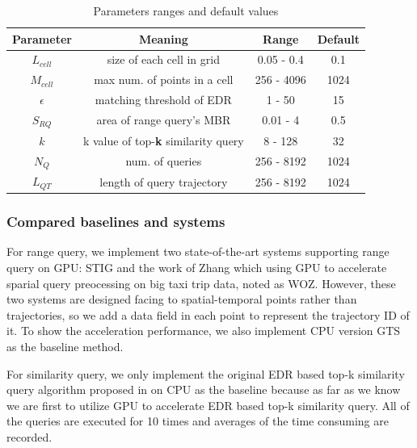 \documentclass[conference]{IEEEtran}
\begin{document}
\begin{table}[!t]
	\renewcommand{\arraystretch}{1.3}
	\caption{Parameters ranges and default values}
	\label{table_param}
	\centering
	\begin{tabular}{|c||c|c|c|}
		\hline
		Parameter & Meaning & Range & Default\\
		\hline
		$L_{cell}$ & size of each cell in grid & 0.05 - 0.4 & 0.1\\
		\hline
		$M_{cell}$ & max num. of points in a cell & 256 - 4096 & 1024\\
		\hline
		$\epsilon$ & matching threshold of EDR & 1 - 50 & 15\\
		\hline
		$S_{RQ}$ & area of range query's MBR & 0.01 - 4 & 0.5\\
		\hline
		$k$ & k value of top-\textbf{k} similarity query & 8 - 128 & 32\\
		\hline
		$N_{Q}$ & num. of queries & 256 - 8192 & 1024\\
		\hline
		$L_{QT}$ & length of query trajectory & 256 - 8192 & 1024\\
		\hline
	\end{tabular}
\end{table}

\subsubsection{Compared baselines and systems}

For range query, we implement two state-of-the-art systems supporting range query on GPU: STIG\cite{7498315} and the work of Zhang which using GPU to accelerate sparial query preocessing on big taxi trip data, noted as WOZ\cite{GPUTaxi}. However, these two systems are designed facing to spatial-temporal points rather than trajectories, so we add a data field in each point to represent the trajectory ID of it. To show the acceleration performance, we also implement CPU version GTS as the baseline method.

For similarity query, we only implement the original EDR based top-k similarity query algorithm proposed in \cite{DBLP:conf/sigmod/ChenOO05} on CPU as the baseline because as far as we know we are first to utilize GPU to accelerate EDR based top-k similarity query. All of the queries are executed for 10 times and averages of the time consuming are recorded. 
\end{document}
